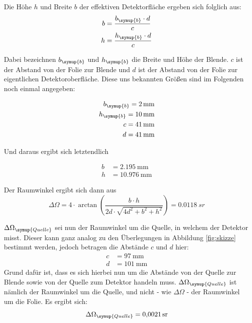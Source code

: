 Die Höhe $h$ und Breite $b$ der effektiven Detektorfläche ergeben sich folglich
aus:
\begin{align*}
  b &= \frac{b_\symup{b} \cdot d}{c} \\
  h &= \frac{h_\symup{b} \cdot d}{c}
\end{align*}

Dabei bezeichnen $b_\symup{b}$ und $h_\symup{b}$ die Breite und Höhe der Blende.
$c$ ist der Abstand von der Folie zur Blende und $d$ ist der Abstand von der Folie
zur eigentlichen Detektoroberfläche. Diese uns bekannten Größen \cite{sample1} sind
im Folgenden noch einmal angegeben:

\begin{align*}
  b_\symup{b} = \SI{2}{\milli\meter} \\
  h_\symup{b} = \SI{10}{\milli\meter} \\
  c = \SI{41}{\milli\meter} \\
  d = \SI{41}{\milli\meter}
\end{align*}

Und daraus ergibt sich letztendlich

\begin{align*}
  b &= \SI{2.195}{\milli\meter} \\
  h &= \SI{10.976}{\milli\meter}
\end{align*}

Der Raumwinkel ergibt sich dann aus \cite{sample2}
\begin{equation}
  \Delta \Omega = 4 \cdot \arctan\left(\frac{b \cdot h}{2d \cdot \sqrt{4d^2 + b^2 + h^2}}\right) = \SI{0.0118}{sr}
\end{equation}

$\Delta \Omega_{\symup{Quelle}}$ sei nun der Raumwinkel um die Quelle, in welchem der Detektor misst.
Dieser kann ganz analog zu den Überlegungen in Abbildung \ref{fig:skizze} bestimmt werden, jedoch betragen die
Abstände $c$ und $d$ hier:
\begin{align*}
  c &= \SI{97}{\milli\meter} \\
  d &= \SI{101}{\milli\meter}
\end{align*}
Grund dafür ist, dass es sich hierbei nun um die Abstände von der Quelle zur Blende
sowie von der Quelle zum Detektor handeln muss. $\Delta \Omega_{\symup{Quelle}}$ ist nämlich
der Raumwinkel um die Quelle, und nicht - wie $\Delta \Omega$ - der Raumwinkel um die Folie.
Es ergibt sich:
\begin{equation*}
  \Delta \Omega_{\symup{Quelle}} = \SI{0.0021}{sr}
\end{equation*}


